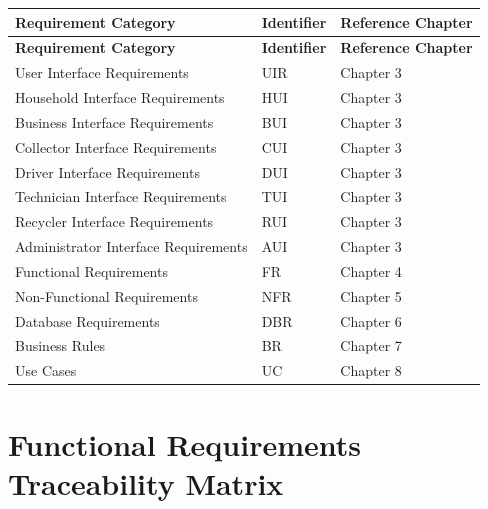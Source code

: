 \begin{longtable}{|p{5cm}|p{3cm}|p{5cm}|}

\hline
\textbf{Requirement Category} &
\textbf{Identifier} &
\textbf{Reference Chapter} \\
\hline
\endfirsthead

\hline
\textbf{Requirement Category} &
\textbf{Identifier} &
\textbf{Reference Chapter} \\
\hline
\endhead

User Interface Requirements &
UIR &
Chapter 3 \\
\hline

Household Interface Requirements &
HUI &
Chapter 3 \\
\hline

Business Interface Requirements &
BUI &
Chapter 3 \\
\hline

Collector Interface Requirements &
CUI &
Chapter 3 \\
\hline

Driver Interface Requirements &
DUI &
Chapter 3 \\
\hline

Technician Interface Requirements &
TUI &
Chapter 3 \\
\hline

Recycler Interface Requirements &
RUI &
Chapter 3 \\
\hline

Administrator Interface Requirements &
AUI &
Chapter 3 \\
\hline

Functional Requirements &
FR &
Chapter 4 \\
\hline

Non-Functional Requirements &
NFR &
Chapter 5 \\
\hline

Database Requirements &
DBR &
Chapter 6 \\
\hline

Business Rules &
BR &
Chapter 7 \\
\hline

Use Cases &
UC &
Chapter 8 \\
\hline

\end{longtable}

\section{Functional Requirements Traceability Matrix}

